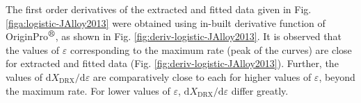 \documentclass[a4paper, 11pt, dvipsnames]{article}
\begin{document}
The first order derivatives of the extracted and fitted data given in Fig. \ref{figa:logistic-JAlloy2013} were obtained using in-built derivative function of OriginPro$^{\text{\small\textregistered}}$, as shown in Fig. \ref{fig:deriv-logistic-JAlloy2013}. It is observed that the values of $\varepsilon$ corresponding to the maximum rate (peak of the curves) are close for extracted and fitted data (Fig. \ref{fig:deriv-logistic-JAlloy2013}). Further, the values of $\text{d}X_\text{DRX}/\text{d}\varepsilon$ are comparatively close to each for higher values of $\varepsilon$, beyond the maximum rate. For lower values of $\varepsilon$, $\text{d}X_\text{DRX}/\text{d}\varepsilon$ differ greatly. 
\end{document}

